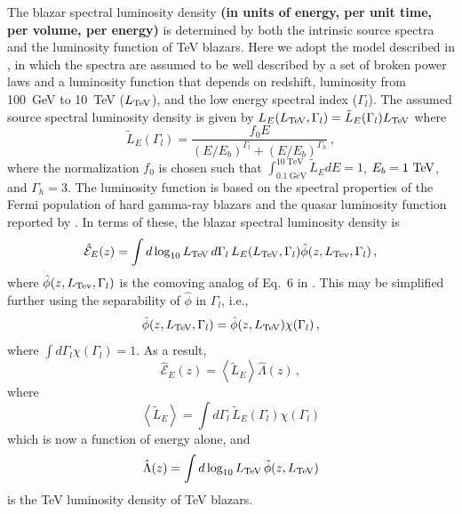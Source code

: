 \documentclass[numberedappendix]{emulateapj}
\newcommand\ALc[1]{{\color{red} \bf #1}} %
\begin{document}
The blazar spectral luminosity density \ALc{(in units of energy, per unit time, per volume, per energy)} is determined by both the
intrinsic source spectra and the luminosity function of TeV blazars.
Here we adopt the model described in \citet{2014ApJ...790..137B}, in
which the spectra are assumed to be well described by a set of broken
power laws and a luminosity function that depends on redshift,
luminosity from 100~GeV to 10~TeV ($L_{\rm TeV}$), and the low energy
spectral index ($\Gamma_l$).  The assumed source spectral luminosity
density is given by 
$L_E(L_{\rm TeV},\Gamma_l)=\tilde{L}_E(\Gamma_l) L_{\rm TeV}$ where
\begin{equation}
\label{eq:intrinsic_spectrum}
\tilde{L}_E(\Gamma_l) = \frac{f_0 E}{(E/E_b)^{\Gamma_l} + (E/E_b)^{\Gamma_h}}\,,
\end{equation}
where the normalization $f_0$ is chosen such that 
$\int_{0.1~\mathrm{GeV}}^{10~\mathrm{TeV}} \tilde{L}_E dE = 1$, $E_b=1~{\rm TeV}$, and
$\Gamma_h=3$.  The luminosity function is based on the spectral
properties of the Fermi population of hard gamma-ray blazars and the
quasar luminosity function reported by \citet{2007ApJ...654..731H}.
In terms of these, the blazar spectral luminosity density is
\begin{equation}\label{eq:spec_lum_dens}
\hat{\mathcal{E}}_E(z)
=
\int d\log_{10}L_{\rm TeV}\,d\Gamma_l\, L_E(L_{\rm TeV},\Gamma_l)
\hat{\phi}(z,L_{\rm Tev},\Gamma_l)\,,
\end{equation}
where $\hat{\phi}(z,L_{\rm Tev},\Gamma_l)$ is the comoving analog of Eq.~6 in \citet{2014ApJ...790..137B}.  This may be simplified
further using the separability of $\hat{\phi}$ in $\Gamma_l$, i.e.,
\begin{equation}
\hat{\phi}(z,L_{\rm TeV},\Gamma_l)
=
\hat{\phi}(z,L_{\rm TeV})
\chi(\Gamma_l)\,,
\end{equation}
where $\int d\Gamma_l \chi(\Gamma_l) = 1$.  As a result,
\begin{equation}
\label{eq:mean_heat}
\hat{\mathcal{E}}_E(z)
=
\left< \tilde{L}_E \right>
\hat{\Lambda}(z)\,,
\end{equation}
where
\begin{equation}
\left< \tilde{L}_E \right>
=
\int d\Gamma_l\,\tilde{L}_E(\Gamma_l) \chi(\Gamma_l)
\end{equation}
which is now a function of energy alone, and
\begin{equation}
\hat{\Lambda}(z) = 
\int d\log_{10}L_{\rm TeV}\,\hat{\phi}(z,L_{\rm TeV})
\end{equation}
is the TeV luminosity density of TeV blazars.  
\end{document}
